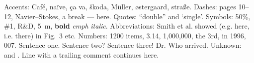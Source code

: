 
Accents: Caf\'e, na\"ive, \c{c}a va, \v{s}koda, M\"uller, \o{}stergaard, stra\ss e.
Dashes: pages 10--12, Navier--Stokes, a break --- here.
Quotes: ``double'' and `single'. Symbols: 50\%, \#1, R\&D, 5~m, \textbf{bold} \emph{emph} \textit{italic}.
Abbreviations: Smith et al. showed (e.g. here, i.e. there) in Fig.~3 etc.
Numbers: 1200 items, 3.14, 1,000,000, the 3rd, in 1996, 007.
Sentence one. Sentence two? Sentence three! Dr. Who arrived.
Unknown:  and \alsounknown.
Line with a trailing comment %
continues here.
\newcommand{\secret}{HIDDENWORD}
\makeatletter\makeatother

